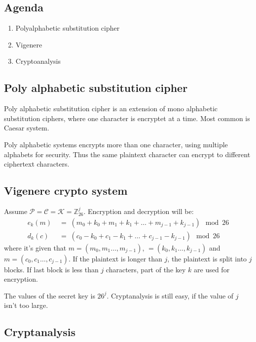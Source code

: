 

\subsection*{Agenda}
\begin{enumerate}
\item Polyalphabetic substitution cipher
\item Vigenere
\item Cryptoanalysis
\end{enumerate}

\subsection{Poly alphabetic substitution cipher}

Poly alphabetic substitution cipher is an extension of mono alphabetic
substitution ciphers, where one character is encryptet at a time. Most common is Caesar system.

Poly alphabetic systems encrypts more than one character, using
multiple alphabets for security. Thus the same plaintext character can
encrypt to different ciphertext characters.

\subsection{Vigenere crypto system}

Assume $\mathcal{P} = \mathcal{C} = \mathcal{K} =
\mathbb{Z}_{26}^j$. Encryption and decryption will be:
\begin{align*}
  e_{k}(m) \; &= \; (m_0+k_0 +m_1+k_1 + \ldots
  +m_{j-1}+k_{j-1} )  \mod 26\\
  d_{k}(c) \; &= \; (c_0-k_0 +c_1-k_1 + \ldots +c_{j-1}-k_{j-1} ) \mod 26
\end{align*}
where it's given that $m=(m_0,m_1 \ldots,m_{j-1})$, $=(k_0,k_1
\ldots,k_{j-1})$ and $m=(c_0,c_1 \ldots,c_{j-1})$. If the plaintext is
longer than $j$, the plaintext is split into $j$ blocks. If last block
is less than $j$ characters, part of the key $k$ are used for
encryption.

The values of the secret key is $26^j$. Cryptanalysis is still easy,
if the value of $j$ isn't too large.
\subsection{Cryptanalysis}

